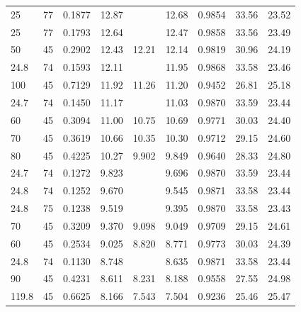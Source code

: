 \begin{small}
\tabletail{\bottomhline}
\tablelasttail{\bottomhline}
\begin{supertabular}{p{1.1cm}p{1.1cm}p{1.3cm}p{1.3cm}p{1.3cm}p{1.3cm}p{1.3cm}p{1.3cm}p{1.3cm}}
25 & 77 & 0.1877 & 12.87 &  & 12.68 & 0.9854 & 33.56 & 23.52 \\
25 & 77 & 0.1793 & 12.64 &  & 12.47 & 0.9858 & 33.56 & 23.49 \\
50 & 45 & 0.2902 & 12.43 & 12.21 & 12.14 & 0.9819 & 30.96 & 24.19 \\
24.8 & 74 & 0.1593 & 12.11 &  & 11.95 & 0.9868 & 33.58 & 23.46 \\
100 & 45 & 0.7129 & 11.92 & 11.26 & 11.20 & 0.9452 & 26.81 & 25.18 \\
24.7 & 74 & 0.1450 & 11.17 &  & 11.03 & 0.9870 & 33.59 & 23.44 \\
60 & 45 & 0.3094 & 11.00 & 10.75 & 10.69 & 0.9771 & 30.03 & 24.40 \\
70 & 45 & 0.3619 & 10.66 & 10.35 & 10.30 & 0.9712 & 29.15 & 24.60 \\
80 & 45 & 0.4225 & 10.27 & 9.902 & 9.849 & 0.9640 & 28.33 & 24.80 \\
24.7 & 74 & 0.1272 & 9.823 &  & 9.696 & 0.9870 & 33.59 & 23.44 \\
24.8 & 74 & 0.1252 & 9.670 &  & 9.545 & 0.9871 & 33.58 & 23.44 \\
24.8 & 75 & 0.1238 & 9.519 &  & 9.395 & 0.9870 & 33.58 & 23.43 \\
70 & 45 & 0.3209 & 9.370 & 9.098 & 9.049 & 0.9709 & 29.15 & 24.61 \\
60 & 45 & 0.2534 & 9.025 & 8.820 & 8.771 & 0.9773 & 30.03 & 24.39 \\
24.8 & 74 & 0.1130 & 8.748 &  & 8.635 & 0.9871 & 33.58 & 23.44 \\
90 & 45 & 0.4231 & 8.611 & 8.231 & 8.188 & 0.9558 & 27.55 & 24.98 \\
119.8 & 45 & 0.6625 & 8.166 & 7.543 & 7.504 & 0.9236 & 25.46 & 25.47 \\

\end{supertabular}
\end{small}
